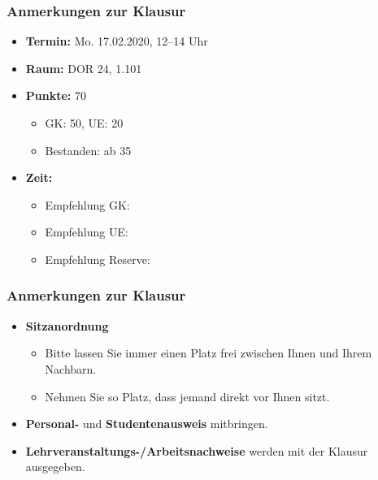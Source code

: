 \begin{frame}
\frametitle{Anmerkungen zur Klausur}

\begin{itemize}
	\item \textbf{Termin:} Mo. 17.02.2020, 12--14 Uhr
	\medskip 
	
	\item \textbf{Raum:} DOR 24, 1.101
	\medskip 

	\item \textbf{Punkte:} 70
	\begin{itemize}
		\item GK: 50, UE: 20
		\item Bestanden: ab 35
	\end{itemize}
	\medskip 

	\item \textbf{Zeit:} 
	\begin{itemize}
		\item Empfehlung GK: 
		\item Empfehlung UE: 
		\item Empfehlung Reserve: 
	\end{itemize}		
\end{itemize}

\end{frame}


\begin{frame}
\frametitle{Anmerkungen zur Klausur}

\begin{itemize}

	\item \textbf{Sitzanordnung}
	\begin{itemize}
		\item Bitte lassen Sie immer einen Platz frei zwischen Ihnen und Ihrem Nachbarn.
		\item Nehmen Sie so Platz, dass jemand direkt vor Ihnen sitzt.
	\end{itemize}
	\medskip 

	\item \textbf{Personal-} und \textbf{Studentenausweis} mitbringen.
	\medskip 

	\item \textbf{Lehrveranstaltungs-/Arbeitsnachweise} werden mit der Klausur ausgegeben.

	 	
	
	
\end{itemize}

\end{frame}


